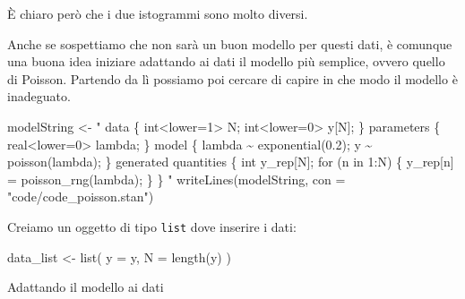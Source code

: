\documentclass[
  10pt,
  italian,
  a4paper,
  extrafontsizes,onecolumn,openright
  ]{memoir}
\newenvironment{Shaded}{\begin{snugshade}}{\end{snugshade}}
\newcommand{\AttributeTok}[1]{\textcolor[rgb]{0.77,0.63,0.00}{#1}}
\newcommand{\DecValTok}[1]{\textcolor[rgb]{0.00,0.00,0.81}{#1}}
\newcommand{\FunctionTok}[1]{\textcolor[rgb]{0.00,0.00,0.00}{#1}}
\newcommand{\NormalTok}[1]{#1}
\newcommand{\OtherTok}[1]{\textcolor[rgb]{0.56,0.35,0.01}{#1}}
\newcommand{\SpecialCharTok}[1]{\textcolor[rgb]{0.00,0.00,0.00}{#1}}
\newcommand{\StringTok}[1]{\textcolor[rgb]{0.31,0.60,0.02}{#1}}
\begin{document}
\noindent
È chiaro però che i due istogrammi sono molto diversi.

Anche se sospettiamo che non sarà un buon modello per questi dati, è comunque una buona idea iniziare adattando ai dati il modello più semplice, ovvero quello di Poisson. Partendo da lì possiamo poi cercare di capire in che modo il modello è inadeguato.

\begin{Shaded}
\begin{Highlighting}[]
\NormalTok{modelString }\OtherTok{\textless{}{-}} \StringTok{"}
\StringTok{data \{}
\StringTok{  int\textless{}lower=1\textgreater{} N;}
\StringTok{  int\textless{}lower=0\textgreater{} y[N];}
\StringTok{\}}
\StringTok{parameters \{}
\StringTok{  real\textless{}lower=0\textgreater{} lambda;}
\StringTok{\}}
\StringTok{model \{}
\StringTok{  lambda \textasciitilde{} exponential(0.2);}
\StringTok{  y \textasciitilde{} poisson(lambda);}
\StringTok{\}}
\StringTok{generated quantities \{}
\StringTok{  int y\_rep[N];}
\StringTok{  for (n in 1:N) \{}
\StringTok{    y\_rep[n] = poisson\_rng(lambda);}
\StringTok{  \}}
\StringTok{\}}
\StringTok{"}
\FunctionTok{writeLines}\NormalTok{(modelString, }\AttributeTok{con =} \StringTok{"code/code\_poisson.stan"}\NormalTok{)}
\end{Highlighting}
\end{Shaded}

\noindent
Creiamo un oggetto di tipo \texttt{list} dove inserire i dati:

\begin{Shaded}
\begin{Highlighting}[]
\NormalTok{data\_list }\OtherTok{\textless{}{-}} \FunctionTok{list}\NormalTok{(}
  \AttributeTok{y =}\NormalTok{ y,}
  \AttributeTok{N =} \FunctionTok{length}\NormalTok{(y)}
\NormalTok{)}
\end{Highlighting}
\end{Shaded}

\noindent
Adattando il modello ai dati

\begin{Shaded}
\end{Shaded}
\end{document}

